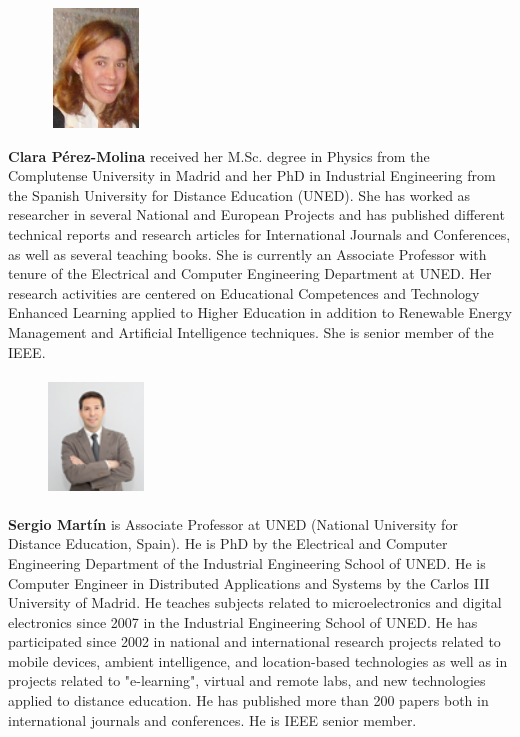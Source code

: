 \newpage %
\setlength\intextsep{0pt} %
\begin{figure} 
    \includegraphics[width=1in,height=1.25in,clip,keepaspectratio]{illustrations/photo_clara.jpg}
\end{figure}\par
\noindent \textbf{Clara Pérez-Molina} received her M.Sc. degree in Physics from the Complutense University in Madrid and her PhD in Industrial Engineering from the Spanish University for Distance Education (UNED). She has worked as researcher in several National and European Projects and has published different technical reports and research articles for International Journals and Conferences, as well as several teaching books. She is currently an Associate Professor with tenure of the Electrical and Computer Engineering Department at UNED.
Her research activities are centered on Educational Competences and Technology Enhanced Learning applied to Higher Education in addition to Renewable Energy Management and Artificial Intelligence techniques. She is senior member of the IEEE.\\

\setlength\intextsep{0pt} %
\begin{figure} 
    \includegraphics[width=1in,height=1.25in,clip,keepaspectratio]{illustrations/photo_sergio_martin.png}
\end{figure}\par
\noindent \textbf{Sergio Martín} is Associate Professor at UNED (National University for Distance Education, Spain). He is PhD by the Electrical and Computer Engineering Department of the Industrial Engineering School of UNED. He is Computer Engineer in Distributed Applications and Systems by the Carlos III University of Madrid. He teaches subjects related to microelectronics and digital electronics since 2007 in the Industrial Engineering School of UNED. He has participated since 2002 in national and international research projects related to mobile devices, ambient intelligence, and location-based technologies as well as in projects related to "e-learning", virtual and remote labs, and new technologies applied to distance education. He has published more than 200 papers both in international journals and conferences. He is IEEE senior member.\\


